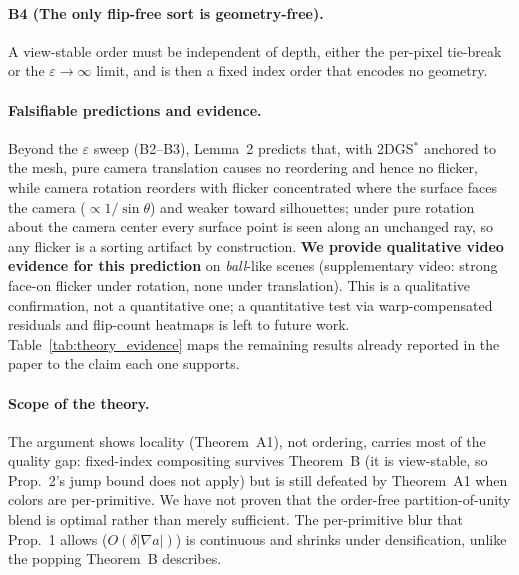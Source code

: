 \paragraph{B4 (The only flip-free sort is geometry-free).} A view-stable order must be independent
of depth, either the per-pixel tie-break or the $\varepsilon\to\infty$ limit, and is then a fixed
index order that encodes no geometry.

\paragraph{Falsifiable predictions and evidence.} Beyond the $\varepsilon$ sweep (B2--B3), Lemma~2
predicts that, with 2DGS$^{*}$ anchored to the mesh, pure camera translation causes no reordering
and hence no flicker, while camera rotation reorders with flicker concentrated where the surface
faces the camera ($\propto1/\sin\theta$) and weaker toward silhouettes; under pure rotation about
the camera center every surface point is seen along an unchanged ray, so any flicker is a sorting
artifact by construction. \textbf{We provide qualitative video evidence for this prediction} on
\emph{ball}-like scenes (supplementary video: strong face-on flicker under rotation, none under
translation). This is a qualitative confirmation, not a quantitative one; a quantitative test via
warp-compensated residuals and flip-count heatmaps is left to future work. Table~\ref{tab:theory_evidence} maps the remaining
results already reported in the paper to the claim each one supports.


\paragraph{Scope of the theory.} The argument shows locality (Theorem~A1), not ordering, carries most
of the quality gap: fixed-index compositing survives Theorem~B (it is view-stable, so Prop.~2's
jump bound does not apply) but is still defeated by Theorem~A1 when colors are per-primitive. 
We have not proven that the order-free partition-of-unity blend is optimal rather than merely
sufficient. The per-primitive blur that
Prop.~1 allows ($O(\delta|\nabla a|)$) is continuous and shrinks under densification, unlike the
popping Theorem~B describes.

